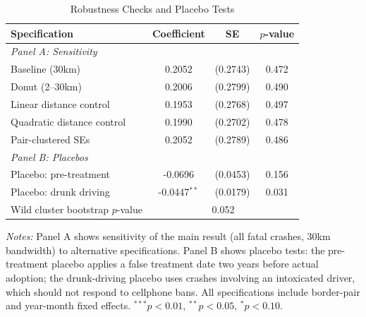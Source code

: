 \begin{table}[htbp]
\centering
\caption{Robustness Checks and Placebo Tests}
\label{tab:robustness}
\begin{tabular}{lccc}
\hline\hline
Specification & Coefficient & SE & $p$-value \\
\hline
\multicolumn{4}{l}{\textit{Panel A: Sensitivity}} \\
Baseline (30km) & 0.2052 & (0.2743) & 0.472 \\
Donut (2--30km) & 0.2006 & (0.2799) & 0.490 \\
Linear distance control & 0.1953 & (0.2768) & 0.497 \\
Quadratic distance control & 0.1990 & (0.2702) & 0.478 \\
Pair-clustered SEs & 0.2052 & (0.2789) & 0.486 \\
[6pt]
\multicolumn{4}{l}{\textit{Panel B: Placebos}} \\
Placebo: pre-treatment & -0.0696 & (0.0453) & 0.156 \\
Placebo: drunk driving & -0.0447$^{**}$ & (0.0179) & 0.031 \\
Wild cluster bootstrap $p$-value & \multicolumn{3}{c}{0.052} \\
\hline\hline
\end{tabular}
\begin{tablenotes}
\item \textit{Notes:} Panel A shows sensitivity of the main result (all fatal crashes, 30km bandwidth) to alternative specifications. Panel B shows placebo tests: the pre-treatment placebo applies a false treatment date two years before actual adoption; the drunk-driving placebo uses crashes involving an intoxicated driver, which should not respond to cellphone bans. All specifications include border-pair and year-month fixed effects. $^{***}p<0.01$, $^{**}p<0.05$, $^{*}p<0.10$.
\end{tablenotes}
\end{table}


